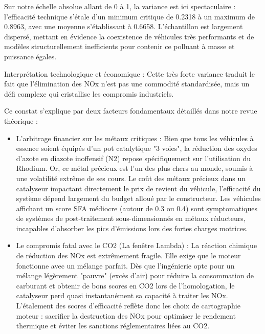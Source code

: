 Sur notre échelle absolue allant de 0 à 1, la variance est ici spectaculaire : l'efficacité technique s'étale d'un minimum critique de 0.2318 à un maximum de 0.8963, avec une moyenne s'établissant à 0.6658. L'échantillon est largement dispersé, mettant en évidence la coexistence de véhicules très performants et de modèles structurellement inefficients pour contenir ce polluant à masse et puissance égales.

\vspace{0.6em}

Interprétation technologique et économique : Cette très forte variance traduit le fait que l'élimination des NOx n'est pas une commodité standardisée, mais un défi complexe qui cristallise les compromis industriels.

\vspace{0.6em}

Ce constat s'explique par deux facteurs fondamentaux détaillés dans notre revue théorique :

\vspace{0.6em}

\begin{itemize}
    \item L'arbitrage financier sur les métaux critiques : Bien que tous les véhicules à essence soient équipés d'un pot catalytique "3 voies", la réduction des oxydes d'azote en diazote inoffensif (N2) repose spécifiquement sur l'utilisation du Rhodium. Or, ce métal précieux est l'un des plus chers au monde, soumis à une volatilité extrême de ses cours. Le coût des métaux précieux dans un catalyseur impactant directement le prix de revient du véhicule, l'efficacité du système dépend largement du budget alloué par le constructeur. Les véhicules affichant un score SFA médiocre (autour de 0.3 ou 0.4) sont symptomatiques de systèmes de post-traitement sous-dimensionnés en métaux réducteurs, incapables d'absorber les pics d'émissions lors des fortes charges motrices.

    \vspace{0.5em}

    \item Le compromis fatal avec le CO2 (La fenêtre Lambda) : La réaction chimique de réduction des NOx est extrêmement fragile. Elle exige que le moteur fonctionne avec un mélange parfait. Dès que l'ingénierie opte pour un mélange légèrement "pauvre" (excès d'air) pour réduire la consommation de carburant et obtenir de bons scores en CO2 lors de l'homologation, le catalyseur perd quasi instantanément sa capacité à traiter les NOx. L'étalement des scores d'efficacité reflète donc les choix de cartographie moteur : sacrifier la destruction des NOx pour optimiser le rendement thermique et éviter les sanctions réglementaires liées au CO2.
\end{itemize}

